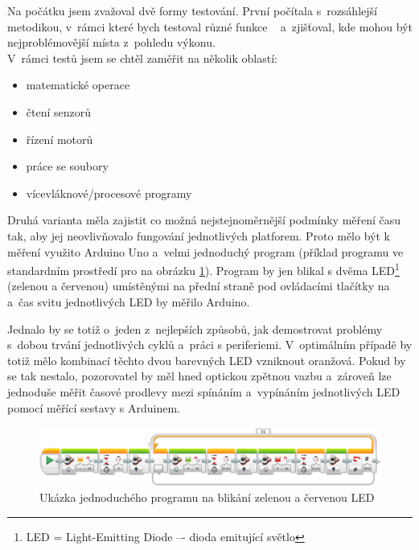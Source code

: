 Na počátku jsem zvažoval dvě formy testování. První počítala s~rozsáhlejší metodikou, v~rámci které bych testoval různé funkce \EVthree{}~ a~zjišťoval, kde mohou být nejproblémovější místa z~pohledu výkonu. \\

V~rámci testů jsem se chtěl zaměřit na několik oblastí: %

\begin{itemize}
	\item matematické operace
	\item čtení senzorů
	\item řízení motorů
	\item práce se soubory
	\item vícevláknové/procesové programy
\end{itemize}  

Druhá varianta měla zajistit co možná nejstejnoměrnější podmínky měření času tak, aby jej neovlivňovalo fungování jednotlivých platforem. 
Proto mělo být k měření využito Arduino Uno a~velmi jednoduchý program  (příklad programu ve standardním prostředí pro \EVthree{ }na obrázku \ref{fig:LoopTimeLEDblinking-measuring}).
Program by jen blikal s dvěma LED\footnote{LED = Light-Emitting Diode –- dioda emitující světlo} (zelenou a červenou) umístěnými na přední straně pod ovládacími tlačítky na  a~čas svitu jednotlivých LED by měřilo Arduino.




Jednalo by se totiž o~jeden z~nejlepších způsobů, jak demostrovat problémy s~dobou trvání jednotlivých cyklů a~práci s periferiemi. 
V~optimálním případě by totiž mělo kombinací těchto dvou barevných LED vzniknout oranžová. 
Pokud by se tak nestalo, pozorovatel by měl hned optickou zpětnou vazbu a~zároveň lze jednoduše měřit časové prodlevy mezi spínáním a~vypínáním jednotlivých LED pomocí měřící sestavy s Arduinem.

\begin{figure}[h]
	\centering
	\includegraphics[width=\textwidth]{images/measuring-ev3-software_LoopTimeLEDblinking.png}
	\caption[Ukázka jednoduchého programu na blikání zelenou a červenou LED]{Ukázka jednoduchého programu na blikání zelenou a červenou LED}
	\label{fig:LoopTimeLEDblinking-measuring}
\end{figure}

